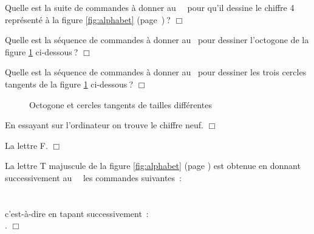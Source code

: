 \begin{exercice}{
Quelle est la suite de commandes à donner au \robot\ \robotCbN\ pour qu'il dessine le chiffre 4 
représenté à la figure \ref{fig:alphabet} \hbox{(page \pageref{fig:alphabet})$\:$?}
$\Box$}\end{exercice}

\begin{exercice}{
Quelle est la séquence de commandes à donner au \robot\ pour
dessiner l'octogone de la figure \ref{fig:octogone-cercles} 
\hbox{ci-dessous$\:$?}
$\Box$}\end{exercice}

\begin{exercice}{
Quelle est la séquence de commandes à donner au \robot\ pour
dessiner les trois cercles tangents de la figure \ref{fig:octogone-cercles} 
\hbox{ci-dessous$\:$?}
$\Box$}\end{exercice}

\begin{figure}[htbp]
 \caption{Octogone et cercles tangents de tailles différentes}
 \label{fig:octogone-cercles}
\end{figure}

\begin{corrige}{
En essayant sur l'ordinateur on trouve le chiffre neuf.
$\Box$}\end{corrige}

\begin{corrige}{
La lettre F.
$\Box$}\end{corrige}

\begin{corrige}{
La lettre T majuscule de la figure \ref{fig:alphabet} (page \pageref{fig:alphabet}) est
obtenue en donnant successivement au \robot\ \robotCbN\ les commandes suivantes~:\\
\hspace*{2ex}{\idt av();\ av();\ av();\ av();\ pqtd();\ av()}\\
\hspace*{2ex}{\idt pqtd();\ pqtd();\ av();\ av()}\\
c'est-à-dire en tapant \hbox{successivement~:}\\
\hspace*{2ex}    \touche{$+$}  \touche{$+$} \touche{$+$} 
 .
$\Box$}\end{corrige}

